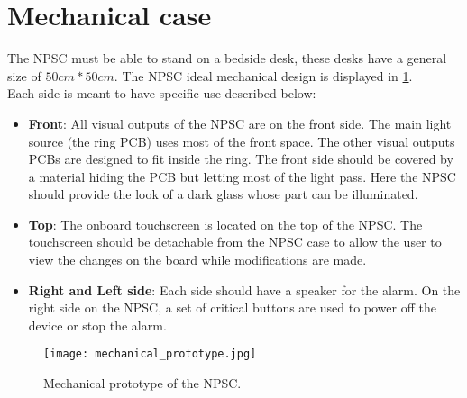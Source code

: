 \section{Mechanical case}
The NPSC must be able to stand on a bedside desk, these desks have a general size of $50cm*50cm$. The NPSC ideal mechanical design is displayed in \cref{fig:mechanical_prototype}.\\
Each side is meant to have specific use described below:
\begin{itemize}
\item \textbf{Front}: All visual outputs of the NPSC are on the front side. The main light source (the ring PCB) uses most of the front space. The other visual outputs PCBs are designed to fit inside the ring. The front side should be covered by a material hiding the PCB but letting most of the light pass. Here the NPSC should provide the look of a dark glass whose part can be illuminated.
\item \textbf{Top}: The onboard touchscreen is located on the top of the NPSC. The touchscreen should be detachable from the NPSC case to allow the user to view the changes on the board while modifications are made.
\item \textbf{Right and Left side}: Each side should have a speaker for the alarm. On the right side on the NPSC, a set of critical buttons are used to power off the device or stop the alarm.
\end{itemize} 
\begin{figure}[ht]
\centering
\texttt{[image: mechanical\_prototype.jpg]}
\caption{Mechanical prototype of the NPSC.}
\label{fig:mechanical_prototype}
\end{figure}